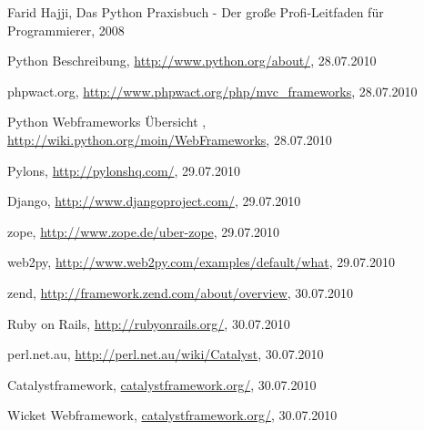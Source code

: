 
\begin{thebibliography}{99}
Farid Hajji, Das Python Praxisbuch - Der große Profi-Leitfaden für
Programmierer, 2008

Python Beschreibung, \url{http://www.python.org/about/}, 28.07.2010

phpwact.org, \url{http://www.phpwact.org/php/mvc_frameworks}, 28.07.2010

Python Webframeworks Übersicht ,
\url{http://wiki.python.org/moin/WebFrameworks}, 28.07.2010

Pylons, \url{http://pylonshq.com/}, 29.07.2010

Django, \url{http://www.djangoproject.com/}, 29.07.2010

zope, \url{http://www.zope.de/uber-zope}, 29.07.2010

web2py, \url{http://www.web2py.com/examples/default/what}, 29.07.2010

zend, \url{http://framework.zend.com/about/overview}, 30.07.2010

Ruby on Rails, \url{http://rubyonrails.org/}, 30.07.2010

perl.net.au, \url{http://perl.net.au/wiki/Catalyst}, 30.07.2010

Catalystframework, \url{catalystframework.org/}, 30.07.2010

Wicket Webframework, \url{catalystframework.org/}, 30.07.2010

\end{thebibliography}



%
